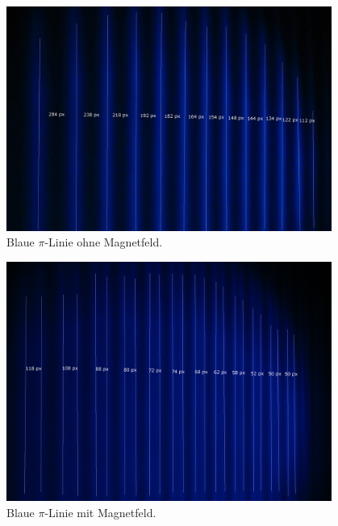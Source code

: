 \begin{figure}
  \centering
  \includegraphics[width=0.95\textwidth]{graphics/auswertung/IMG_1635.png}
  \caption{Blaue $\pi$-Linie ohne Magnetfeld.}
  \label{fig:b_pi}
\end{figure}
\begin{figure}
  \centering
  \includegraphics[width=0.95\textwidth]{graphics/auswertung/IMG_1644.png}
  \caption{Blaue $\pi$-Linie mit Magnetfeld.}
  \label{fig:b_pi_B}
\end{figure}

